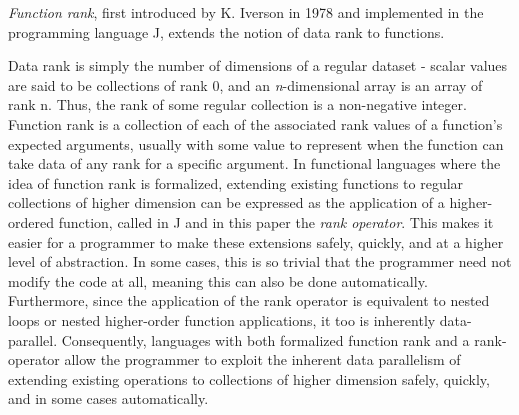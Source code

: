\textit{Function rank}, first introduced by K. Iverson in 1978\cite{opandfunc} and implemented in the programming language J, extends the notion of data rank to functions.\begin{comment}TODO cite\end{comment}%
Data rank is simply the number of dimensions of a regular dataset - scalar values are said to be collections of rank 0, and an \textit{n}-dimensional array is an array of rank n.
Thus, the rank of some regular collection is a non-negative integer.%
Function rank is a collection of each of the associated rank values of a function's expected arguments, usually with some value to represent when the function can take data of any rank for a specific argument.
In functional languages where the idea of function rank is formalized, extending existing functions to regular collections of higher dimension can be expressed as the application of a higher-ordered function, called in J and in this paper the \textit{rank operator}.%
This makes it easier for a programmer to make these extensions safely, quickly, and at a higher level of abstraction. %
In some cases, this is so trivial that the programmer need not modify the code at all, meaning this can also be done automatically.
Furthermore, since the application of the rank operator is equivalent to nested loops or nested higher-order function applications, it too is inherently data-parallel.
Consequently, languages with both formalized function rank and a rank-operator allow the programmer to exploit the inherent data parallelism of extending existing operations to collections of higher dimension safely, quickly, and in some cases automatically.%

